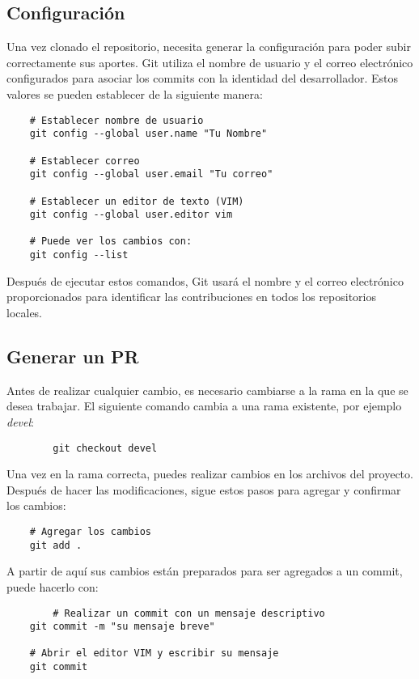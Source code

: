 \documentclass[a4paper]{article}
\begin{document}
\subsection{Configuración}
\indent Una vez clonado el repositorio, necesita generar la configuración para poder subir correctamente sus aportes. 
Git utiliza el nombre de usuario y el correo electrónico configurados para asociar los commits con la identidad del desarrollador. Estos valores se pueden establecer de la siguiente manera:

\begin{lstlisting}
    # Establecer nombre de usuario
    git config --global user.name "Tu Nombre"

    # Establecer correo
    git config --global user.email "Tu correo"

    # Establecer un editor de texto (VIM)
    git config --global user.editor vim

    # Puede ver los cambios con:
    git config --list

\end{lstlisting}

Después de ejecutar estos comandos, Git usará el nombre y el correo electrónico proporcionados para identificar las contribuciones en todos los repositorios locales.

\subsection{Generar un PR}

Antes de realizar cualquier cambio, es necesario cambiarse a la rama en la que se desea trabajar. El siguiente comando cambia a una rama existente, por ejemplo \textit{devel}:

    \begin{lstlisting}
        git checkout devel
    \end{lstlisting}

Una vez en la rama correcta, puedes realizar cambios en los archivos del proyecto. Después de hacer las modificaciones, sigue estos pasos para agregar y confirmar los cambios:
\begin{lstlisting}
    # Agregar los cambios
    git add .
\end{lstlisting}
A partir de aquí sus cambios están preparados para ser agregados a un commit, puede hacerlo con:

\begin{lstlisting}
        # Realizar un commit con un mensaje descriptivo
    git commit -m "su mensaje breve"

    # Abrir el editor VIM y escribir su mensaje
    git commit
\end{lstlisting}
\end{document}
